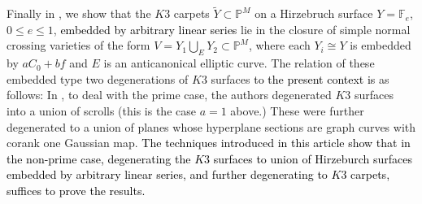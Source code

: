 \documentclass[11pt,twoside]{amsart}
\theoremstyle{plain}
\numberwithin{equation}{section}
\theoremstyle{definition}
\newtheorem{definition}[theorem]{Definition}
\begin{document}
Finally in , we show that the $K3$ carpets $\widetilde{Y} \subset \mathbb{P}^M$ %
on a Hirzebruch surface $Y=\mathbb{F}_e$, $0 \leq e \leq 1$, \textcolor{black}{embedded by arbitrary linear series} 
lie in the closure of simple normal crossing varieties of the form $V = Y_1 \bigcup_E Y_2 \subset \mathbb{P}^M$, where each $Y_i \cong Y$ is embedded by $aC_0+bf$ and $E$ is an anticanonical elliptic curve.  The relation of these embedded type two degenerations of $K3$ surfaces \textcolor{black}{to the present context is} as follows: In \cite{CLM93}, to deal with the prime case, the authors degenerated $K3$ surfaces into a union of scrolls (this is the case $a=1$ above.) These were further degenerated to a union of planes whose hyperplane sections are graph curves with corank one Gaussian map. \textcolor{black}{The techniques introduced in this article show that in the non-prime case, degenerating the $K3$ surfaces to union of Hirzeburch surfaces embedded by arbitrary linear series, and further degenerating to $K3$ carpets, suffices to prove the results.} %



\end{document}
